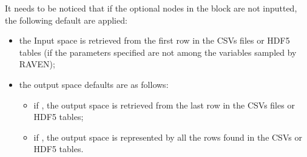 \begin{itemize}
  It needs to be noticed that if the optional nodes in the block  are not inputted, the following default are applied:
    \begin{itemize}
       \item the Input space is retrieved from the first row in the CSVs files or HDF5 tables (if the parameters specified are not among the variables sampled by RAVEN);
       \item  the output space defaults are as follows:
       \begin{itemize}
           \item if , the output space is retrieved from the last row in the CSVs files or HDF5 tables;
           \item if , the output space is represented by all the rows found in  the CSVs or HDF5 tables.
        \end{itemize}
    \end{itemize}
\end{itemize}

